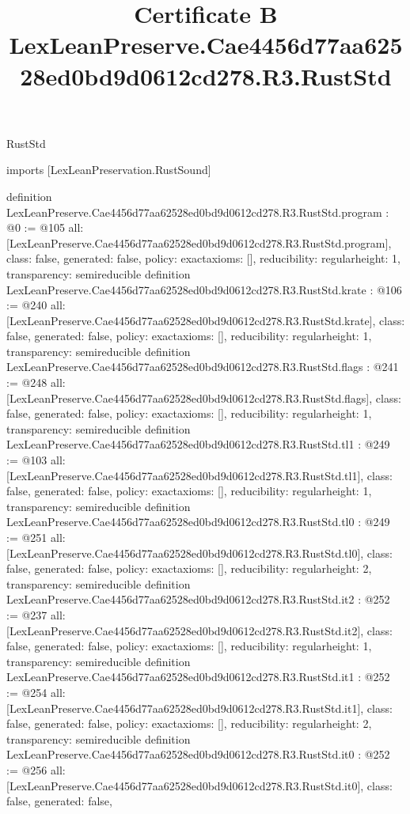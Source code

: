 \begin{lexlean}{RustStd}
\title{Certificate B LexLeanPreserve.Cae4456d77aa62528ed0bd9d0612cd278.R3.RustStd}
\begin{coremodule}
imports [LexLeanPreservation.RustSound]

definition LexLeanPreserve.Cae4456d77aa62528ed0bd9d0612cd278.R3.RustStd.program : @0 := @105 {
  all: [LexLeanPreserve.Cae4456d77aa62528ed0bd9d0612cd278.R3.RustStd.program],
  class: false,
  generated: false,
  policy: exact{axioms: []},
  reducibility: regular{height: 1},
  transparency: semireducible
}
definition LexLeanPreserve.Cae4456d77aa62528ed0bd9d0612cd278.R3.RustStd.krate : @106 := @240 {
  all: [LexLeanPreserve.Cae4456d77aa62528ed0bd9d0612cd278.R3.RustStd.krate],
  class: false,
  generated: false,
  policy: exact{axioms: []},
  reducibility: regular{height: 1},
  transparency: semireducible
}
definition LexLeanPreserve.Cae4456d77aa62528ed0bd9d0612cd278.R3.RustStd.flags : @241 := @248 {
  all: [LexLeanPreserve.Cae4456d77aa62528ed0bd9d0612cd278.R3.RustStd.flags],
  class: false,
  generated: false,
  policy: exact{axioms: []},
  reducibility: regular{height: 1},
  transparency: semireducible
}
definition LexLeanPreserve.Cae4456d77aa62528ed0bd9d0612cd278.R3.RustStd.tl1 : @249 := @103 {
  all: [LexLeanPreserve.Cae4456d77aa62528ed0bd9d0612cd278.R3.RustStd.tl1],
  class: false,
  generated: false,
  policy: exact{axioms: []},
  reducibility: regular{height: 1},
  transparency: semireducible
}
definition LexLeanPreserve.Cae4456d77aa62528ed0bd9d0612cd278.R3.RustStd.tl0 : @249 := @251 {
  all: [LexLeanPreserve.Cae4456d77aa62528ed0bd9d0612cd278.R3.RustStd.tl0],
  class: false,
  generated: false,
  policy: exact{axioms: []},
  reducibility: regular{height: 2},
  transparency: semireducible
}
definition LexLeanPreserve.Cae4456d77aa62528ed0bd9d0612cd278.R3.RustStd.it2 : @252 := @237 {
  all: [LexLeanPreserve.Cae4456d77aa62528ed0bd9d0612cd278.R3.RustStd.it2],
  class: false,
  generated: false,
  policy: exact{axioms: []},
  reducibility: regular{height: 1},
  transparency: semireducible
}
definition LexLeanPreserve.Cae4456d77aa62528ed0bd9d0612cd278.R3.RustStd.it1 : @252 := @254 {
  all: [LexLeanPreserve.Cae4456d77aa62528ed0bd9d0612cd278.R3.RustStd.it1],
  class: false,
  generated: false,
  policy: exact{axioms: []},
  reducibility: regular{height: 2},
  transparency: semireducible
}
definition LexLeanPreserve.Cae4456d77aa62528ed0bd9d0612cd278.R3.RustStd.it0 : @252 := @256 {
  all: [LexLeanPreserve.Cae4456d77aa62528ed0bd9d0612cd278.R3.RustStd.it0],
  class: false,
  generated: false,
}
\end{coremodule}
\end{lexlean}
